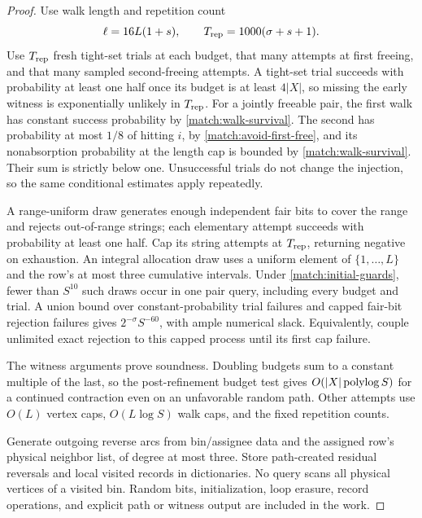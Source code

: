 \begin{proof}
Use walk length and repetition count
\[
                    \ell=16L(1+s),\qquad
                    T_{\rm rep}=1000(\sigma+s+1).
\]
Use \(T_{\rm rep}\) fresh tight-set trials at each budget, that
many attempts at first freeing, and that many sampled second-freeing
attempts.  A tight-set trial succeeds with probability at least
one half once its budget is at least \(4|X|\), so missing the
early witness is exponentially unlikely in \(T_{\rm rep}\).
For a jointly freeable pair, the first walk has constant success
probability by \eqref{match:walk-survival}.  The second has probability
at most \(1/8\) of hitting \(i\), by
\eqref{match:avoid-first-free}, and its nonabsorption probability
at the length cap is bounded by \eqref{match:walk-survival}.
Their sum is strictly below one.  Unsuccessful trials do not change
the injection, so the same conditional estimates apply repeatedly.

A range-uniform draw generates enough independent fair bits to
cover the range and rejects out-of-range strings; each elementary
attempt succeeds with probability at least one half.
Cap its string attempts at \(T_{\rm rep}\), returning negative
on exhaustion.  An integral allocation draw uses a uniform element
of \(\{1,\ldots,L\}\) and the row's at most three cumulative intervals.
Under \eqref{match:initial-guards}, fewer than \(S^{10}\) such
draws occur in one pair query, including every budget and trial.
A union bound over constant-probability trial failures and capped
fair-bit rejection failures gives \(2^{-\sigma}S^{-60}\), with
ample numerical slack.  Equivalently, couple unlimited exact
rejection to this capped process until its first cap failure.

The witness arguments prove soundness.  Doubling budgets sum to
a constant multiple of the last, so the post-refinement budget test
gives \(O(|X|\operatorname{polylog} S)\) for a continued contraction even on an
unfavorable random path.  Other attempts use \(O(L)\) vertex caps,
\(O(L\log S)\) walk caps, and the fixed repetition counts.

Generate outgoing reverse arcs from bin/assignee data and the
assigned row's physical neighbor list, of degree at most three.
Store path-created residual reversals and local visited records
in dictionaries.  No query scans all physical vertices of a visited
bin.  Random bits, initialization, loop erasure, record operations,
and explicit path or witness output are included in the work.
\end{proof}

